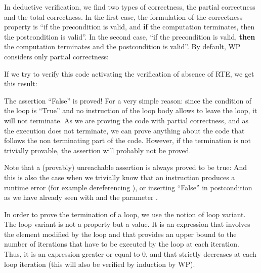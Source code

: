 

In deductive verification, we find two types of correctness, the partial
correctness and the total correctness. In the first case, the
formulation of the correctness property is ``if the precondition is
valid, and \textbf{if} the computation terminates, then the
postcondition is valid''. In the second case, ``if the precondition is
valid, \textbf{then} the computation terminates and the postcondition is
valid''. By default, WP considers only partial correctness:






If we try to verify this code activating the verification of absence of
RTE, we get this result:






The assertion ``False'' is proved! For a very simple reason: since the
condition of the loop is ``True'' and no instruction of the loop body
allows to leave the loop, it will not terminate. As we are proving the
code with partial correctness, and as the execution does not terminate,
we can prove anything about the code that follows the non terminating
part of the code. However, if the termination is not trivially provable,
the assertion will probably not be proved.



\begin{Information}
  Note that a (provably) unreachable assertion is always proved to be true:
  And this is also the case when we trivially know that an instruction
  produces a runtime error (for example dereferencing ), or
  inserting ``False'' in postcondition as we have already seen with
   and the parameter .
\end{Information}


In order to prove the termination of a loop, we use the notion of loop
variant. The loop variant is not a property but a value. It is an
expression that involves the element modified by the loop and that
provides an upper bound to the number of iterations that have to be
executed by the loop at each iteration. Thus, it is an expression
greater or equal to 0, and that strictly decreases at each loop
iteration (this will also be verified by induction by WP).


